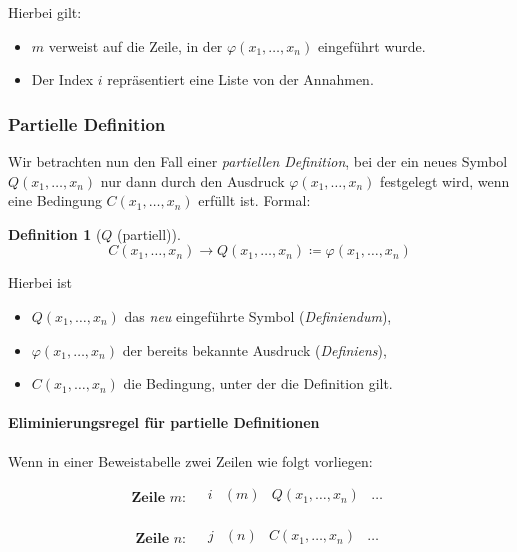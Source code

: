 \documentclass{book}
\theoremstyle{plain}
\theoremstyle{remark}
\theoremstyle{definition}
\newtheorem{definition}{Definition}[section]
\begin{document}
Hierbei gilt:
\begin{itemize}
    \item \(m\) verweist auf die Zeile, in der \(\varphi(x_1,\dots,x_n)\) eingeführt wurde.
    \item Der Index \(i\) repräsentiert eine Liste von der Annahmen.
\end{itemize}

\subsubsection{Partielle Definition}
Wir betrachten nun den Fall einer \emph{partiellen Definition}, bei der ein neues Symbol \(Q(x_1,\dots,x_n)\) nur dann durch den Ausdruck \(\varphi(x_1,\dots,x_n)\) festgelegt wird, wenn eine Bedingung \(C(x_1,\dots,x_n)\) erfüllt ist. Formal:

\begin{definition}[\(Q\) (partiell)]
\label{CLpxSubOnewDotswxSubnRpToQLpxSubOnewDotswxSubnRpDefEqVarphiLpxSubOnewDotswxSubnRp}
\[
C(x_1,\dots,x_n)\rightarrow Q(x_1,\dots,x_n) \coloneqq \varphi(x_1,\dots,x_n)
\]
\end{definition}

Hierbei ist 
\begin{itemize}
    \item \(Q(x_1,\dots,x_n)\) das \emph{neu} eingeführte Symbol (\emph{Definiendum}), 
    \item \(\varphi(x_1,\dots,x_n)\) der bereits bekannte Ausdruck (\emph{Definiens}),
    \item \(C(x_1,\dots,x_n)\) die Bedingung, unter der die Definition gilt.
\end{itemize}

\paragraph{Eliminierungsregel für partielle Definitionen}
Wenn in einer Beweistabelle zwei Zeilen wie folgt vorliegen:

\[
\textbf{Zeile }m: 
\quad
\begin{array}{llll}
   i & (m) & Q(x_1,\dots,x_n) & \dots \\
\end{array}
\]

\[
\textbf{Zeile }n:
\quad
\begin{array}{llll}
   j & (n) & C(x_1,\dots,x_n) & \dots \\
\end{array}
\]
\end{document}
